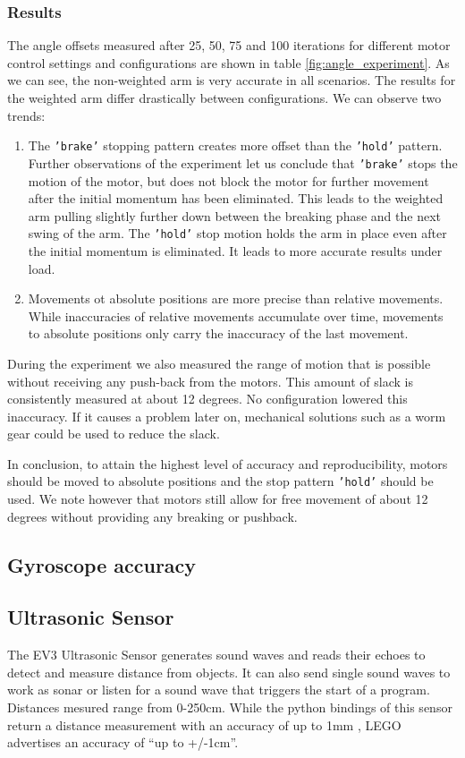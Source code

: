 \documentclass[11pt, a4paper]{article}
\begin{document}
\subsubsection*{Results}
The angle offsets measured after 25, 50, 75 and 100 iterations for different motor control settings and configurations are shown in table \ref{fig:angle_experiment}. As we can see, the non-weighted arm is very accurate in all scenarios. The results for the weighted arm differ drastically between configurations. We can observe two trends:
\begin{enumerate}
	\item The \texttt{'brake'} stopping pattern creates more offset than the \texttt{'hold'} pattern. Further observations of the experiment let us conclude that \texttt{'brake'} stops the motion of the motor, but does not block the motor for further movement after the initial momentum has been eliminated. This leads to the weighted arm pulling slightly further down between the breaking phase and the next swing of the arm. The \texttt{'hold'} stop motion holds the arm in place even after the initial momentum is eliminated. It leads to more accurate results under load.
	\item Movements ot absolute positions are more precise than relative movements. While inaccuracies of relative movements accumulate over time, movements to absolute positions only carry the inaccuracy of the last movement.
\end{enumerate}
During the experiment we also measured the range of motion that is possible without receiving any push-back from the motors. This amount of slack is consistently measured at about 12 degrees. No configuration lowered this inaccuracy. If it causes a problem later on, mechanical solutions such as a worm gear could be used to reduce the slack.

\bigskip
In conclusion, to attain the highest level of accuracy and reproducibility, motors should be moved to absolute positions and the stop pattern \texttt{'hold'} should be used. We note however that motors still allow for free movement of about 12 degrees without providing any breaking or pushback.




\subsection{Gyroscope accuracy}

\subsection{Ultrasonic Sensor}
The EV3 Ultrasonic Sensor generates sound waves and reads their echoes to detect and measure distance from objects. It can also send single sound waves to work as sonar or listen for a sound wave that triggers the start of a program. Distances mesured range from 0-250cm. While the python bindings of this sensor return a distance measurement with an accuracy of up to 1mm \cite{ev3_python}, LEGO advertises an accuracy of  ``up to +/-1cm''. \cite{ultraosnic_sensor}
\end{document}

